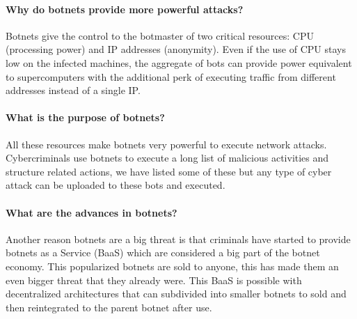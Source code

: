 \paragraph{Why do botnets provide more powerful attacks?} Botnets give the control to the botmaster of two critical resources: CPU (processing power) and IP addresses (anonymity). Even if the use of CPU stays low on the infected machines, the aggregate of bots can provide power equivalent to supercomputers with the additional perk of executing traffic from different addresses instead of a single IP.

\paragraph{What is the purpose of botnets?} All these resources make botnets very powerful to execute network attacks. 
Cybercriminals use botnets to execute a long list of malicious activities and structure related actions, we have listed some of these but any type of cyber attack can be uploaded to these bots and executed.

\paragraph{What are the advances in botnets?} Another reason botnets are a big threat is that criminals have started to provide botnets as a Service (BaaS) which are considered a big part of the botnet economy. This popularized botnets are sold to anyone, this has made them an even bigger threat that they already were.
This BaaS is possible with decentralized architectures that can subdivided into smaller botnets to sold and then reintegrated to the parent botnet after use.

